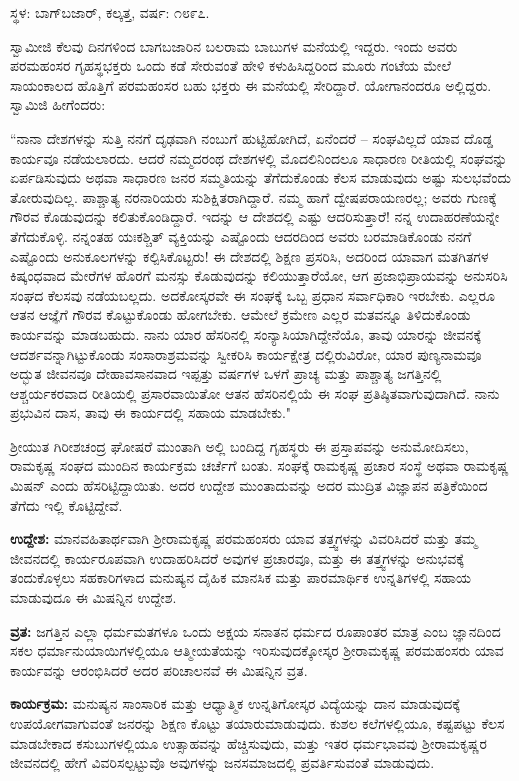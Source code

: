 \centerline{ಸ್ಥಳ: ಬಾಗ್‌ಬಜಾರ್, ಕಲ್ಕತ್ತ, ವರ್ಷ: ೧೮೯೭.}

ಸ್ವಾಮೀಜಿ ಕೆಲವು ದಿನಗಳಿಂದ ಬಾಗಬಜಾರಿನ ಬಲರಾಮ ಬಾಬುಗಳ ಮನೆಯಲ್ಲಿ ಇದ್ದರು. ಇಂದು ಅವರು ಪರಮಹಂಸರ ಗೃಹಸ್ಥಭಕ್ತರು ಒಂದು ಕಡೆ ಸೇರುವಂತೆ ಹೇಳಿ ಕಳುಹಿಸಿದ್ದರಿಂದ ಮೂರು ಗಂಟೆಯ ಮೇಲೆ ಸಾಯಂಕಾಲದ ಹೊತ್ತಿಗೆ ಪರಮಹಂಸರ ಬಹು ಭಕ್ತರು ಈ ಮನೆಯಲ್ಲಿ ಸೇರಿದ್ದಾರೆ. ಯೋಗಾನಂದರೂ ಅಲ್ಲಿದ್ದರು. ಸ್ವಾಮಿಜಿ ಹೀಗೆಂದರು:

“ನಾನಾ ದೇಶಗಳನ್ನು ಸುತ್ತಿ ನನಗೆ ದೃಢವಾಗಿ ನಂಬುಗೆ ಹುಟ್ಟಿಹೋಗಿದೆ, ಏನೆಂದರೆ – ಸಂಘವಿಲ್ಲದೆ ಯಾವ ದೊಡ್ಡ ಕಾರ್ಯವೂ ನಡೆಯಲಾರದು. ಆದರೆ ನಮ್ಮದರಂಥ ದೇಶಗಳಲ್ಲಿ ಮೊದಲಿನಿಂದಲೂ ಸಾಧಾರಣ ರೀತಿಯಲ್ಲಿ ಸಂಘವನ್ನು ಏರ್ಪಡಿಸುವುದು ಅಥವಾ ಸಾಧಾರಣ ಜನರ ಸಮ್ಮತಿಯನ್ನು ತೆಗೆದುಕೊಂಡು ಕೆಲಸ ಮಾಡುವುದು ಅಷ್ಟು ಸುಲಭವೆಂದು ತೋರುವುದಿಲ್ಲ. ಪಾಶ್ಚಾತ್ಯ ನರನಾರಿಯರು ಸುಶಿಕ್ಷಿತರಾಗಿದ್ದಾರೆ. ನಮ್ಮ ಹಾಗೆ ದ್ವೇಷಪರಾಯಣರಲ್ಲ; ಅವರು ಗುಣಕ್ಕೆ ಗೌರವ ಕೊಡುವುದನ್ನು ಕಲಿತುಕೊಂಡಿದ್ದಾರೆ. ಇದನ್ನು ಆ ದೇಶದಲ್ಲಿ ಎಷ್ಟು ಆದರಿಸುತ್ತಾರೆ! ನನ್ನ ಉದಾಹರಣೆಯನ್ನೇ ತೆಗೆದುಕೊಳ್ಳಿ. ನನ್ನಂತಹ ಯಃಕಶ್ಚಿತ್ ವ್ಯಕ್ತಿಯನ್ನು ಎಷ್ಟೊಂದು ಆದರದಿಂದ ಅವರು ಬರಮಾಡಿಕೊಂಡು ನನಗೆ ಎಷ್ಟೊಂದು ಅನುಕೂಲಗಳನ್ನು ಕಲ್ಪಿಸಿಕೊಟ್ಟರು! ಈ ದೇಶದಲ್ಲಿ ಶಿಕ್ಷಣ ಪ್ರಸರಿಸಿ, ಅದರಿಂದ ಯಾವಾಗ ಮತಗಿತಗಳ ಕಿಷ್ಕಂಧವಾದ ಮೇರೆಗಳ ಹೊರಗೆ ಮನಸ್ಸು ಕೊಡುವುದನ್ನು ಕಲಿಯುತ್ತಾರೆಯೋ, ಆಗ ಪ್ರಜಾಭಿಪ್ರಾಯವನ್ನು ಅನುಸರಿಸಿ ಸಂಘದ ಕೆಲಸವು ನಡೆಯಬಲ್ಲದು. ಅದಕೋಸ್ಕರವೇ ಈ ಸಂಘಕ್ಕೆ ಒಬ್ಬ ಪ್ರಧಾನ ಸರ್ವಾಧಿಕಾರಿ ಇರಬೇಕು. ಎಲ್ಲರೂ ಆತನ ಆಜ್ಞೆಗೆ ಗೌರವ ಕೊಟ್ಟುಕೊಂಡು ಹೋಗಬೇಕು. ಆಮೇಲೆ ಕ್ರಮೇಣ ಎಲ್ಲರ ಮತವನ್ನೂ ತಿಳಿದುಕೊಂಡು ಕಾರ್ಯವನ್ನು ಮಾಡಬಹುದು. ನಾನು ಯಾರ ಹೆಸರಿನಲ್ಲಿ ಸಂನ್ಯಾಸಿಯಾಗಿದ್ದೇನೆಯೊ, ತಾವು ಯಾರನ್ನು ಜೀವನಕ್ಕೆ ಆದರ್ಶವನ್ನಾಗಿಟ್ಟುಕೊಂಡು ಸಂಸಾರಾಶ್ರಮವನ್ನು ಸ್ವೀಕರಿಸಿ ಕಾರ್ಯಕ್ಷೇತ್ರ ದಲ್ಲಿರುವಿರೋ, ಯಾರ ಪುಣ್ಯನಾಮವೂ ಅದ್ಭುತ ಜೀವನವೂ ದೇಹಾವಸಾನವಾದ ಇಪ್ಪತ್ತು ವರ್ಷಗಳ ಒಳಗೆ ಪ್ರಾಚ್ಯ ಮತ್ತು ಪಾಶ್ಚಾತ್ಯ ಜಗತ್ತಿನಲ್ಲಿ ಆಶ್ಚರ್ಯಕರವಾದ ರೀತಿಯಲ್ಲಿ ಪ್ರಸಾರವಾಯಿತೋ ಆತನ ಹೆಸರಿನಲ್ಲಿಯೆ ಈ ಸಂಘ ಪ್ರತಿಷ್ಠಿತವಾಗುವುದಾಗಿದೆ. ನಾನು ಪ್ರಭುವಿನ ದಾಸ, ತಾವು ಈ ಕಾರ್ಯದಲ್ಲಿ ಸಹಾಯ ಮಾಡಬೇಕು."

ಶ‍್ರೀಯುತ ಗಿರೀಶಚಂದ್ರ ಘೋಷರೆ ಮುಂತಾಗಿ ಅಲ್ಲಿ ಬಂದಿದ್ದ ಗೃಹಸ್ಥರು ಈ ಪ್ರಸ್ತಾಪವನ್ನು ಅನುಮೋದಿಸಲು, ರಾಮಕೃಷ್ಣ ಸಂಘದ ಮುಂದಿನ ಕಾರ್ಯಕ್ರಮ ಚರ್ಚೆಗೆ ಬಂತು. ಸಂಘಕ್ಕೆ ರಾಮಕೃಷ್ಣ ಪ್ರಚಾರ ಸಂಸ್ಥೆ ಅಥವಾ ರಾಮಕೃಷ್ಣ ಮಿಷನ್ ಎಂದು ಹೆಸರಿಟ್ಟಿದ್ದಾಯಿತು. ಅದರ ಉದ್ದೇಶ ಮುಂತಾದುವನ್ನು ಅದರ ಮುದ್ರಿತ ವಿಜ್ಞಾಪನ ಪತ್ರಿಕೆಯಿಂದ ತೆಗೆದು ಇಲ್ಲಿ ಕೊಟ್ಟಿದ್ದೇವೆ.

\textbf{ಉದ್ದೇಶ:} ಮಾನವಹಿತಾರ್ಥವಾಗಿ ಶ‍್ರೀರಾಮಕೃಷ್ಣ ಪರಮಹಂಸರು ಯಾವ ತತ್ತ್ವಗಳನ್ನು ವಿವರಿಸಿದರೆ ಮತ್ತು ತಮ್ಮ ಜೀವನದಲ್ಲಿ ಕಾರ್ಯರೂಪವಾಗಿ ಉದಾಹರಿಸಿದರೆ ಅವುಗಳ ಪ್ರಚಾರವೂ, ಮತ್ತು ಈ ತತ್ತ್ವಗಳನ್ನು ಅನುಭವಕ್ಕೆ ತಂದುಕೊಳ್ಳಲು ಸಹಕಾರಿಗಳಾದ ಮನುಷ್ಯನ ದೈಹಿಕ ಮಾನಸಿಕ ಮತ್ತು ಪಾರಮಾರ್ಥಿಕ ಉನ್ನತಿಗಳಲ್ಲಿ ಸಹಾಯ ಮಾಡುವುದೂ ಈ ಮಿಷನ್ನಿನ ಉದ್ದೇಶ.

\textbf{ವ್ರತ:} ಜಗತ್ತಿನ ಎಲ್ಲಾ ಧರ್ಮಮತಗಳೂ ಒಂದು ಅಕ್ಷಯ ಸನಾತನ ಧರ್ಮದ ರೂಪಾಂತರ ಮಾತ್ರ ಎಂಬ ಜ್ಞಾನದಿಂದ ಸಕಲ ಧರ್ಮಾನುಯಾಯಿಗಳಲ್ಲಿಯೂ ಆತ್ಮೀಯತೆಯನ್ನು ಇರಿಸುವುದಕ್ಕೋಸ್ಕರ ಶ‍್ರೀರಾಮಕೃಷ್ಣ ಪರಮಹಂಸರು ಯಾವ ಕಾರ್ಯವನ್ನು ಆರಂಭಿಸಿದರೆ ಅದರ ಪರಿಚಾಲನವೆ ಈ ಮಿಷನ್ನಿನ ವ್ರತ.

\textbf{ಕಾರ್ಯಕ್ರಮ:} ಮನುಷ್ಯನ ಸಾಂಸಾರಿಕ ಮತ್ತು ಆಧ್ಯಾತ್ಮಿಕ ಉನ್ನತಿಗೋಸ್ಕರ ವಿದ್ಯೆಯನ್ನು ದಾನ ಮಾಡುವುದಕ್ಕೆ ಉಪಯೋಗವಾಗುವಂತೆ ಜನರನ್ನು ಶಿಕ್ಷಣ ಕೊಟ್ಟು ತಯಾರುಮಾಡುವುದು. ಕುಶಲ ಕಲೆಗಳಲ್ಲಿಯೂ, ಕಷ್ಟಪಟ್ಟು ಕೆಲಸ ಮಾಡಬೇಕಾದ ಕಸುಬುಗಳಲ್ಲಿಯೂ ಉತ್ಸಾಹವನ್ನು ಹೆಚ್ಚಿಸುವುದು, ಮತ್ತು ಇತರ ಧರ್ಮಭಾವವು ಶ‍್ರೀರಾಮಕೃಷ್ಣರ ಜೀವನದಲ್ಲಿ ಹೇಗೆ ವಿವರಿಸಲ್ಪಟ್ಟುವೊ ಅವುಗಳನ್ನು ಜನಸಮಾಜದಲ್ಲಿ ಪ್ರವರ್ತಿಸುವಂತೆ ಮಾಡುವುದು.

